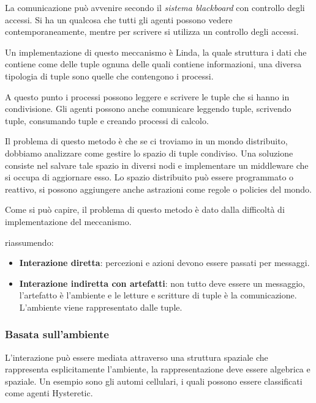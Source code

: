 La comunicazione può avvenire secondo il \textit{sistema blackboard} con
controllo degli accessi. Si ha un qualcosa che tutti gli agenti possono vedere
contemporaneamente, mentre per scrivere si utilizza un controllo degli accessi.

Un implementazione di questo meccanismo è Linda, la quale struttura i dati che
contiene come delle tuple ognuna delle quali contiene informazioni, una diversa
tipologia di tuple sono quelle che contengono i processi.

A questo punto i processi possono leggere e scrivere le tuple che si hanno in
condivisione. Gli agenti possono anche comunicare leggendo tuple, scrivendo tuple,
consumando tuple e creando processi di calcolo.

Il problema di questo metodo è che se ci troviamo in un mondo distribuito,
dobbiamo analizzare come gestire lo spazio di tuple condiviso. Una soluzione
consiste nel salvare tale spazio in diversi nodi e implementare un middleware che
si occupa di aggiornare esso. Lo spazio distribuito può essere programmato o reattivo,
si possono aggiungere anche astrazioni come regole o policies del mondo.

Come si può capire, il problema di questo metodo è dato dalla difficoltà di
implementazione del meccanismo.

riassumendo:
\begin{itemize}
    \item \textbf{Interazione diretta}: percezioni e azioni devono essere passati
          per messaggi.
    \item \textbf{Interazione indiretta con artefatti}:  non tutto deve essere
          un messaggio, l'artefatto è l'ambiente e le letture e scritture di tuple
          è la comunicazione. L'ambiente viene rappresentato dalle tuple.
\end{itemize}
\subsubsection{Basata sull'ambiente}
L'interazione può essere mediata attraverso una struttura spaziale che
rappresenta esplicitamente l'ambiente, la rappresentazione deve essere algebrica
e spaziale. Un esempio sono gli automi cellulari, i quali possono essere
classificati come agenti Hysteretic.
